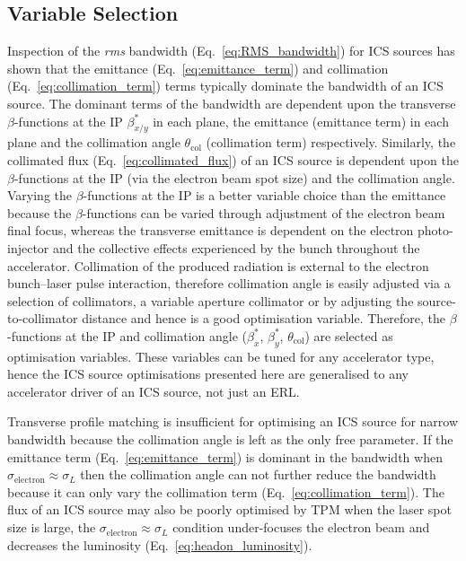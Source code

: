 \documentclass[../main.tex]{subfiles}
\begin{document}
\subsection{Variable Selection}
\label{sec:variable_selection}

Inspection of the \textit{rms} bandwidth (Eq.~\ref{eq:RMS_bandwidth}) for ICS sources has shown that the emittance (Eq.~\ref{eq:emittance_term}) and collimation (Eq.~\ref{eq:collimation_term}) terms typically dominate the bandwidth of an ICS source. The dominant terms of the bandwidth are dependent upon the transverse $\beta$-functions at the IP $\beta^{*}_{x/y}$ in each plane, the emittance (emittance term) in each plane and the collimation angle $\theta_{\mathrm{col}}$ (collimation term) respectively. Similarly, the collimated flux (Eq.~\ref{eq:collimated_flux}) of an ICS source is dependent upon the $\beta$-functions at the IP (via the electron beam spot size) and the collimation angle. Varying the $\beta$-functions at the IP is a better variable choice than the emittance because the $\beta$-functions can be varied through adjustment of the electron beam final focus, whereas the transverse emittance is dependent on the electron photo-injector and the collective effects experienced by the bunch throughout the accelerator. Collimation of the produced radiation is external to the electron bunch--laser pulse interaction, therefore collimation angle is easily adjusted via a selection of collimators, a variable aperture collimator or by adjusting the source-to-collimator distance and hence is a good optimisation variable. Therefore, the $\beta$-functions at the IP and collimation angle ($\beta^{*}_{x}$, $\beta^{*}_{y}$, $\theta_{\mathrm{col}}$) are selected as optimisation variables. These variables can be tuned for any accelerator type, hence the ICS source optimisations presented here are generalised to any accelerator driver of an ICS source, not just an ERL.

Transverse profile matching is insufficient for optimising an ICS source for narrow bandwidth because the collimation angle is left as the only free parameter. If the emittance term (Eq.~\ref{eq:emittance_term}) is dominant in the bandwidth when $\sigma_{\mathrm{electron}} \approx \sigma_{L}$ then the collimation angle can not further reduce the bandwidth because it can only vary the collimation term (Eq.~\ref{eq:collimation_term}). The flux of an ICS source may also be poorly optimised by TPM when the laser spot size is large, the $\sigma_{\mathrm{electron}} \approx \sigma_{L}$ condition under-focuses the electron beam and decreases the luminosity (Eq.~\ref{eq:headon_luminosity}).
\end{document}
